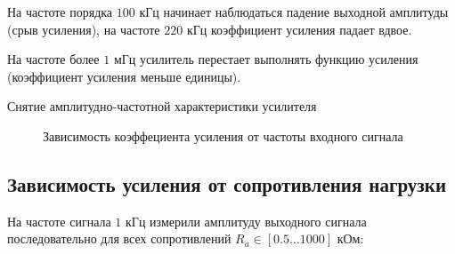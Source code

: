 \documentclass[a4paper,12pt]{extarticle}%
\begin{document}
На частоте порядка $100$ кГц начинает наблюдаться падение выходной амплитуды (срыв усиления), на частоте $220$ кГц коэффициент усиления падает вдвое.

На частоте более $1$ мГц усилитель перестает выполнять функцию усиления (коэффициент усиления меньше единицы).

\begin{table}[h!]
	\begin{center}
	\caption{Снятие амплитудно-частотной характеристики усилителя}
	\label{tab:a-s}


	\end{center}
\end{table}

\begin{figure}[H]
	\centering
		
	\caption{Зависимость коэффециента усиления от частоты входного сигнала}
	\label{fig:ahx} 
\end{figure}

\newpage
\subsection{Зависимость усиления от сопротивления нагрузки}

На частоте сигнала $1$ кГц измерили амплитуду выходного сигнала последовательно для всех сопротивлений $R_a\in[0.5\ldots1000]$ кОм:
\end{document}
